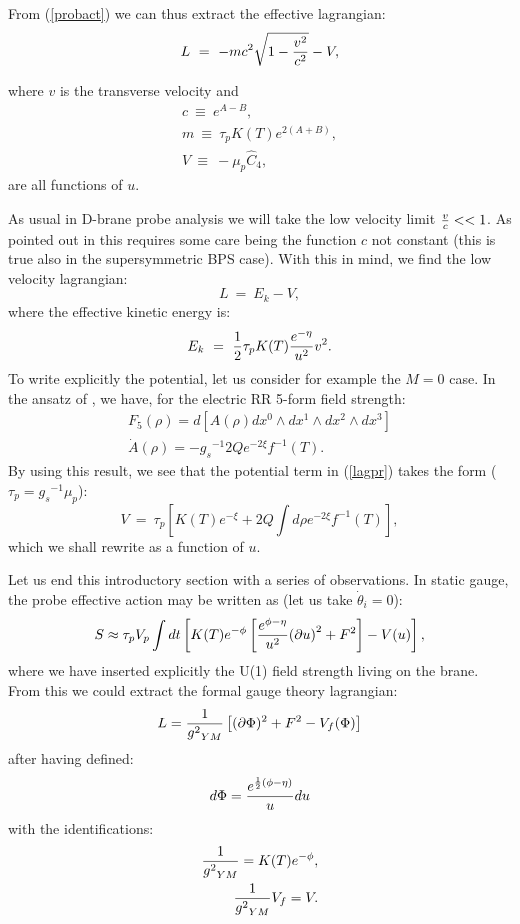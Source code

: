 \documentclass[a4paper,12pt]{article}
\def\half{{1 \over 2}}
\begin{document}
\noindent From (\ref{probact}) we can thus extract the effective lagrangian:
\begin{equation}
L~=~ -mc^2\sqrt{ 1 - {v^2\over{c^2}}} - V,
\end{equation}

\noindent where $v$ is the transverse velocity and
\begin{eqnarray}
c~\equiv~ e^{A-B}, \nonumber \\
m~\equiv~ {\tau_p} K(T)e^{2(A+B)}, \nonumber \\
V~\equiv~ -\mu_p{\hat C}_4 ,
\label{c}
\end{eqnarray}
are all functions of $u$.

As usual in D-brane probe analysis we will take the low velocity limit ${v\over c} <<1$.
As pointed out in \cite{minic} this requires some care being the function $c$
 not constant (this is true also in the supersymmetric BPS case). With this in mind,
we find the low velocity lagrangian:
\begin{equation}
L~=~ E_k - V,
\label{lagpr}
\end{equation}
where the effective kinetic energy is:
\begin{equation}
E_k~=~\half {\tau_p}K(T){e^{-\eta}\over u^2} v^2 .
\label{cinet}
\end{equation}
To write explicitly the potential, let us consider for example the $M=0$
case. In the ansatz of \cite{kt}, we have, for the electric RR 5-form 
field strength:
\begin{eqnarray}
{F_5}(\rho) = d[ A(\rho)d{x^0}\wedge d{x^1}\wedge d{x^2} \wedge d{x^3} ]\\
{\dot A}(\rho)= -{g_s}^{-1}2Q{e^{-2\xi}}f^{-1}(T).
\end{eqnarray}
By using this result, we see that the potential term in (\ref{lagpr}) takes the form 
($\tau_p = {g_s}^{-1}\mu_p$):
\begin{equation}
V~=~ \tau_p\left[ K(T)e^{-\xi} + 2Q\int d\rho e^{-2\xi}f^{-1}(T)\right],
\label{pot}
\end{equation}
which we shall rewrite as a function of $u$.

Let us end this introductory section with a series of observations. In static gauge,
the probe effective action may be written as (let us take $\dot\theta_i=0$):
\begin{equation}
S\approx \tau_pV_p\int dt \left[K(T)e^{-\phi}\left[ {e^{\phi - \eta}\over u^2}{(\partial u)}^2 + F^2\right] - V(u)\right],
\end{equation}
where we have inserted explicitly the U(1) field strength living on the brane.
From this we could extract the formal gauge theory lagrangian:
\begin{equation}
L = {1\over{g^2}_{YM}}\left[ (\partial\Phi)^2 + F^2 - V_f(\Phi)\right]
\end{equation}
after having defined:
\begin{equation}
d\Phi= {e^{\half(\phi - \eta)}\over u} du
\label{PHI}
\end{equation}
with the identifications:
\begin{eqnarray}
{1\over {g^2}_{YM}}= K(T)e^{-\phi}, \nonumber \\
{1\over {g^2}_{YM}}V_f = V .
\label{naive}
\end{eqnarray}   
\end{document}
